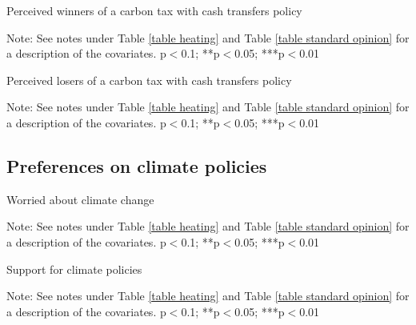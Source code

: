 \documentclass{article}
\begin{document}
\begin{table}[h!]
	\caption{Perceived winners of a carbon tax with cash transfers policy}
	\begin{center}
		\scalebox{0.7}{}
	\end{center}
	{\footnotesize Note: See notes under Table \ref{table heating} and Table \ref{table standard opinion} for a description of the covariates.
	\newline *p$<$0.1; **p$<$0.05; ***p$<$0.01}
\end{table}	

\begin{table}[h!]
	\caption{Perceived losers of a carbon tax with cash transfers policy}
	\begin{center}
		\scalebox{0.7}{}
	\end{center}
	{\footnotesize Note: See notes under Table \ref{table heating} and Table \ref{table standard opinion} for a description of the covariates.
	\newline *p$<$0.1; **p$<$0.05; ***p$<$0.01}
\end{table}	

\clearpage
\subsection{Preferences on climate policies}

\begin{table}[h!]
	\caption{Worried about climate change}
	\begin{center}
		\scalebox{0.7}{}
	\end{center}
	{\footnotesize Note: See notes under Table \ref{table heating} and Table \ref{table standard opinion} for a description of the covariates.
	\newline *p$<$0.1; **p$<$0.05; ***p$<$0.01}
\end{table}	

\begin{table}[h!]
	\caption{Support for climate policies}
	\begin{center}
		\scalebox{0.7}{}
	\end{center}
	{\footnotesize Note: See notes under Table \ref{table heating} and Table \ref{table standard opinion} for a description of the covariates.
	\newline *p$<$0.1; **p$<$0.05; ***p$<$0.01}
\end{table}	
\end{document}
